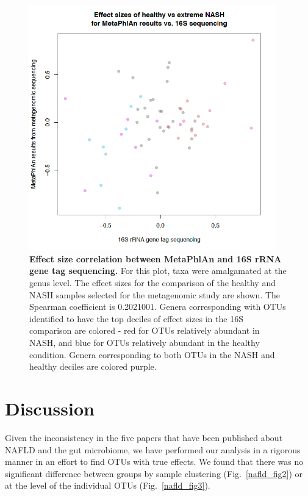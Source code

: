 \begin{figure}[h]
\begin{center}
\includegraphics[width=0.95\textwidth]{metaphlan_16s_effects.png}
\caption{\textbf{Effect size correlation between MetaPhlAn and 16S rRNA gene tag sequencing.} For this plot, taxa were amalgamated at the genus level. The effect sizes for the comparison of the healthy and NASH samples selected for the metagenomic study are shown. The Spearman coefficient is 0.2021001. Genera corresponding with OTUs identified to have the top deciles of effect sizes in the 16S comparison are colored - red for OTUs relatively abundant in NASH, and blue for OTUs relatively abundant in the healthy condition. Genera corresponding to both OTUs in the NASH and healthy deciles are colored purple.}
\end{center}
\label{nafld_metaphlan_effect}
\end{figure}

\FloatBarrier

\section{Discussion}

Given the inconsistency in the five papers that have been published about NAFLD and the gut microbiome, we have performed our analysis in a rigorous manner in an effort to find OTUs with true effects. We found that there was no significant difference between groups by sample clustering (Fig.~\ref{nafld_fig2}) or at the level of the individual OTUs (Fig.~\ref{nafld_fig3}).

